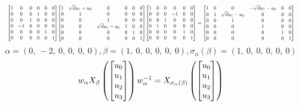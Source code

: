 \documentclass[11pt]{article}
\theoremstyle{definition}
\begin{document}
\[
\scaletoalign{\textwidth}{{\left[\begin{matrix}1 & 0 & 0 & 0 & 0 & 0\\0 & 0 & 0 & 1 & 0 & 0\\0 & 0 & 1 & 0 & 0 & 0\\0 & -1 & 0 & 0 & 0 & 0\\0 & 0 & 0 & 0 & 1 & 0\\0 & 0 & 0 & 0 & 0 & 1\end{matrix}\right]} {\left[\begin{matrix}1 & \sqrt{d} u_{1} + u_{0} & 0 & 0 & 0 & 0\\0 & 1 & 0 & 0 & 0 & 0\\0 & 0 & 1 & 0 & 0 & 0\\0 & 0 & \sqrt{d} u_{1} - u_{0} & 1 & 0 & 0\\0 & 0 & 0 & 0 & 1 & 0\\0 & 0 & 0 & 0 & 0 & 1\end{matrix}\right]} {\left[\begin{matrix}1 & 0 & 0 & 0 & 0 & 0\\0 & 0 & 0 & -1 & 0 & 0\\0 & 0 & 1 & 0 & 0 & 0\\0 & 1 & 0 & 0 & 0 & 0\\0 & 0 & 0 & 0 & 1 & 0\\0 & 0 & 0 & 0 & 0 & 1\end{matrix}\right]} = {\left[\begin{matrix}1 & 0 & 0 & - \sqrt{d} u_{1} - u_{0} & 0 & 0\\0 & 1 & \sqrt{d} u_{1} - u_{0} & 0 & 0 & 0\\0 & 0 & 1 & 0 & 0 & 0\\0 & 0 & 0 & 1 & 0 & 0\\0 & 0 & 0 & 0 & 1 & 0\\0 & 0 & 0 & 0 & 0 & 1\end{matrix}\right]}}
\]
\[
\alpha = \left( 0, \  -2, \  0, \  0, \  0, \  0\right), \beta = \left( 1, \  0, \  0, \  0, \  0, \  0\right), \sigma_{\alpha}(\beta) = \left( 1, \  0, \  0, \  0, \  0, \  0\right)
\]
\[
\scaletoalign{\textwidth}{w_{\alpha} X_{\beta}\left(\left[\begin{matrix}u_{0}\\u_{1}\\u_{2}\\u_{3}\end{matrix}\right]\right) w_{\alpha}^{-1} = X_{\sigma_{\alpha}\left(\beta\right)}\left(\left[\begin{matrix}u_{0}\\u_{1}\\u_{2}\\u_{3}\end{matrix}\right]\right)}
\]
\end{document}
